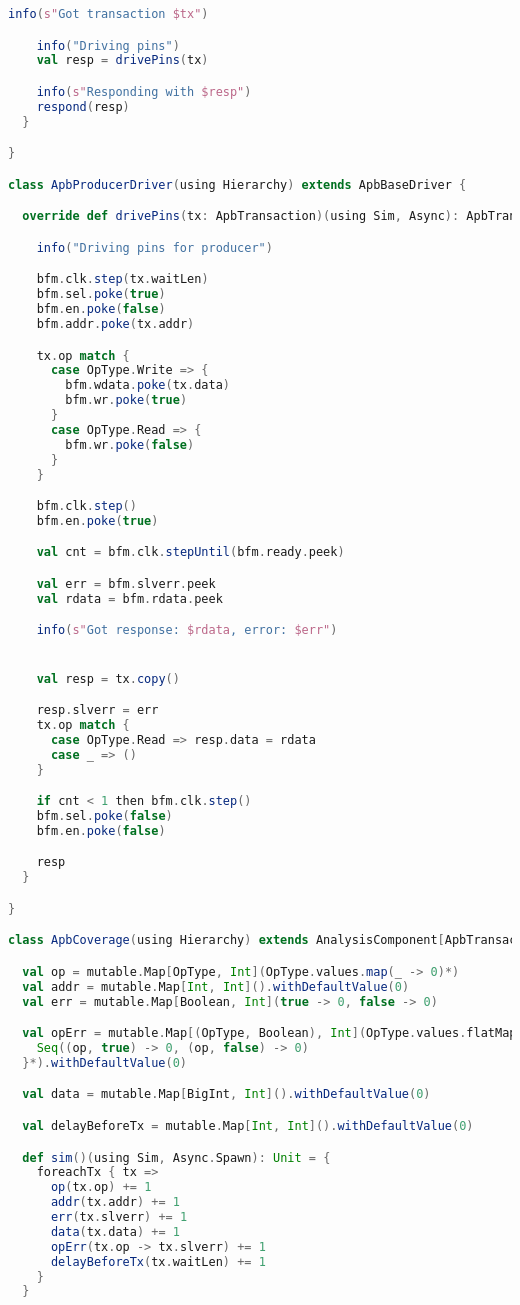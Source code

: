 \begin{lstlisting}[language=scala, captionpos=b, caption=Test code for the APB Didactic SoC subsystem.,label=lst:apb_test]
    info(s"Got transaction $tx")

    info("Driving pins")
    val resp = drivePins(tx)

    info(s"Responding with $resp")
    respond(resp)
  }

}

class ApbProducerDriver(using Hierarchy) extends ApbBaseDriver {

  override def drivePins(tx: ApbTransaction)(using Sim, Async): ApbTransaction = {

    info("Driving pins for producer")

    bfm.clk.step(tx.waitLen)
    bfm.sel.poke(true)
    bfm.en.poke(false)
    bfm.addr.poke(tx.addr)

    tx.op match {
      case OpType.Write => {
        bfm.wdata.poke(tx.data)
        bfm.wr.poke(true)
      }
      case OpType.Read => {
        bfm.wr.poke(false)
      }
    }

    bfm.clk.step()
    bfm.en.poke(true)

    val cnt = bfm.clk.stepUntil(bfm.ready.peek)

    val err = bfm.slverr.peek
    val rdata = bfm.rdata.peek

    info(s"Got response: $rdata, error: $err")


    val resp = tx.copy()

    resp.slverr = err
    tx.op match {
      case OpType.Read => resp.data = rdata
      case _ => ()
    }

    if cnt < 1 then bfm.clk.step()  
    bfm.sel.poke(false)
    bfm.en.poke(false)

    resp
  }

}

class ApbCoverage(using Hierarchy) extends AnalysisComponent[ApbTransaction] {

  val op = mutable.Map[OpType, Int](OpType.values.map(_ -> 0)*)
  val addr = mutable.Map[Int, Int]().withDefaultValue(0)
  val err = mutable.Map[Boolean, Int](true -> 0, false -> 0)

  val opErr = mutable.Map[(OpType, Boolean), Int](OpType.values.flatMap { op =>
    Seq((op, true) -> 0, (op, false) -> 0)
  }*).withDefaultValue(0)

  val data = mutable.Map[BigInt, Int]().withDefaultValue(0)

  val delayBeforeTx = mutable.Map[Int, Int]().withDefaultValue(0)

  def sim()(using Sim, Async.Spawn): Unit = {
    foreachTx { tx =>
      op(tx.op) += 1
      addr(tx.addr) += 1
      err(tx.slverr) += 1
      data(tx.data) += 1
      opErr(tx.op -> tx.slverr) += 1
      delayBeforeTx(tx.waitLen) += 1
    }
  }


\end{lstlisting}
